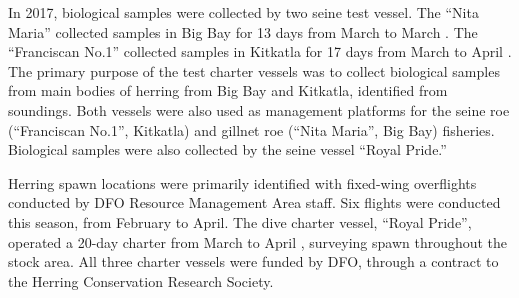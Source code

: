 In 2017, biological samples were collected by two seine test vessel.
The ``Nita Maria'' collected samples in Big Bay for 13 days from March  to March .
The ``Franciscan No.1'' collected samples in Kitkatla for 17 days from March  to April .
The primary purpose of the test charter vessels was to collect biological samples from main bodies of herring from Big Bay and Kitkatla, identified from soundings.
Both vessels were also used as management platforms for the seine roe (``Franciscan No.1'', Kitkatla) and gillnet roe (``Nita Maria'', Big Bay) fisheries.
Biological samples were also collected by the seine vessel ``Royal Pride.''

Herring spawn locations were primarily identified with fixed-wing overflights conducted by DFO Resource Management Area staff.
Six flights were conducted this season, from February to April.
The dive charter vessel, ``Royal Pride'', operated a 20-day charter from March  to April , surveying spawn throughout the stock area.
All three charter vessels were funded by DFO, through a contract to the Herring Conservation Research Society.